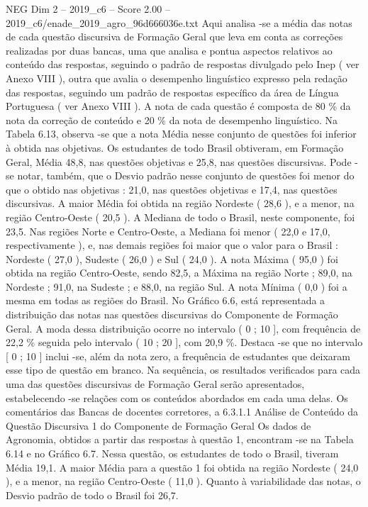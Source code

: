 \begin{textsample}{NEG Dim 2 – 2019\_c6 – Score 2.00 – 2019\_c6/enade\_2019\_agro\_96d666036e.txt}
Aqui analisa -se a média das notas de cada questão discursiva de Formação Geral que leva em conta as correções realizadas por duas bancas, uma que analisa e pontua aspectos relativos ao conteúdo das respostas, seguindo o padrão de respostas divulgado pelo Inep ( ver Anexo VIII ), outra que avalia o desempenho linguístico expresso pela redação das respostas, seguindo um padrão de respostas específico da área de Língua Portuguesa ( ver Anexo VIII ).
A nota de cada questão é composta de 80 \% da nota da correção de conteúdo e 20 \% da nota de desempenho linguístico.
Na Tabela 6.13, observa -se que a nota Média nesse conjunto de questões foi inferior à obtida nas objetivas.
Os estudantes de todo Brasil obtiveram, em Formação Geral, Média 48,8, nas questões objetivas e 25,8, nas questões discursivas.
Pode -se notar, também, que o Desvio padrão nesse conjunto de questões foi menor do que o obtido nas objetivas : 21,0, nas questões objetivas e 17,4, nas questões discursivas.
A maior Média foi obtida na região Nordeste ( 28,6 ), e a menor, na região Centro-Oeste ( 20,5 ).
A Mediana de todo o Brasil, neste componente, foi 23,5.
Nas regiões Norte e Centro-Oeste, a Mediana foi menor ( 22,0 e 17,0, respectivamente ), e, nas demais regiões foi maior que o valor para o Brasil : Nordeste ( 27,0 ), Sudeste ( 26,0 ) e Sul ( 24,0 ).
A nota Máxima ( 95,0 ) foi obtida na região Centro-Oeste, sendo 82,5, a Máxima na região Norte ; 89,0, na Nordeste ; 91,0, na Sudeste ; e 88,0, na região Sul.
A nota Mínima ( 0,0 ) foi a mesma em todas as regiões do Brasil.
No Gráfico 6.6, está representada a distribuição das notas nas questões discursivas do Componente de Formação Geral.
A moda dessa distribuição ocorre no intervalo ( 0 ; 10 ], com frequência de 22,2 \% seguida pelo intervalo ( 10 ; 20 ], com 20,9 \%.
Destaca -se que no intervalo [ 0 ; 10 ] inclui -se, além da nota zero, a frequência de estudantes que deixaram esse tipo de questão em branco.
Na sequência, os resultados verificados para cada uma das questões discursivas de Formação Geral serão apresentados, estabelecendo -se relações com os conteúdos abordados em cada uma delas.
Os comentários das Bancas de docentes corretores, a 6.3.1.1 Análise de Conteúdo da Questão Discursiva 1 do Componente de Formação Geral Os dados de Agronomia, obtidos a partir das respostas à questão 1, encontram -se na Tabela 6.14 e no Gráfico 6.7.
Nessa questão, os estudantes de todo o Brasil, tiveram Média 19,1.
A maior Média para a questão 1 foi obtida na região Nordeste ( 24,0 ), e a menor, na região Centro-Oeste ( 11,0 ).
Quanto à variabilidade das notas, o Desvio padrão de todo o Brasil foi 26,7.

\end{textsample}
